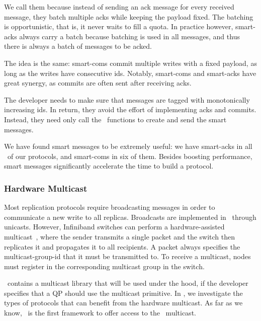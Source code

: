 We call them  because instead of sending an ack message for every received message, they batch multiple acks while keeping the payload fixed.  The batching is opportunistic, that is, it never waits to fill a quota. In practice however, smart-acks always carry a batch because batching is used in all messages, and thus there is always a batch of messages to be acked. 

The idea is the same: smart-coms commit multiple writes with a fixed payload, as long as the writes have consecutive ids. 
Notably, smart-coms and smart-acks have great synergy, as commits are often sent after receiving acks.

The developer needs to make sure that messages are tagged with monotonically increasing ids. In return, they avoid the effort of implementing acks and commits. Instead, they need only call the \odlib~functions to create and send the smart messages.

\custvspace
We have found smart messages to be extremely useful: we have smart-acks in all \pnum~of our protocols, and smart-coms in six of them. 
Besides boosting performance, smart messages significantly accelerate the time to build a protocol.




\subsubsection{Hardware Multicast} \label{sec:nw:mcast}

Most replication protocols require broadcasting messages in order to communicate a new write to all replicas. 
Broadcasts are implemented in \odlib~through unicasts.
However, Infiniband switches can perform a hardware-assisted multicast~\cite{Barak:2015}, where the sender 
transmits a single packet and the switch then replicates it and propagates it to all recipients. A packet always specifies the multicast-group-id that it must be transmitted to.
To receive a multicast, nodes must register in the corresponding multicast group in the switch. 

\odlib~contains a multicast library that will be used under the hood, if the developer specifies that a QP should use the multicast primitive. 
In ,  we investigate the types of protocols that can benefit from the hardware multicast.
As far as we know, \odlib\ is the first framework to offer access to the \RDMA\ multicast.



 

